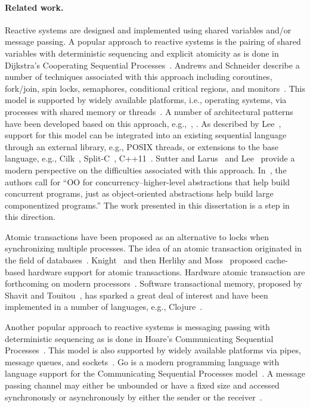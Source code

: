 \paragraph{Related work.}
Reactive systems are designed and implemented using shared variables and/or message passing.
A popular approach to reactive systems is the pairing of shared variables with deterministic sequencing and explicit atomicity as is done in Dijkstra's Cooperating Sequential Processes~\cite{dijkstra1965cooperating}.
Andrews and Schneider describe a number of techniques associated with this approach including coroutines, fork/join, spin locks, semaphores, conditional critical regions, and monitors~\cite{andrews1983concepts}.
This model is supported by widely available platforms, i.e., operating systems, via processes with shared memory or threads~\cite{silberschatz2005operating}.
A number of architectural patterns have been developed based on this approach, e.g.,~\cite{schmidt2000pattern}, \cite{lea2000concurrent}.
As described by Lee~\cite{lee2006problem}, support for this model can be integrated into an existing sequential language through an external library, e.g., POSIX threads, or extensions to the base language, e.g., Cilk~\cite{blumofe1995cilk}, Split-C~\cite{culler1993parallel}, C++11~\cite{cxx11}.
Sutter and Larus~\cite{sutter2005software} and Lee~\cite{lee2006problem} provide a modern perspective on the difficulties associated with this approach.
In~\cite{sutter2005software}, the authors call for ``OO for concurrency--higher-level abstractions that help build concurrent programs, just as object-oriented abstractions help build large componentized programs.''
The work presented in this dissertation is a step in this direction.

Atomic transactions have been proposed as an alternative to locks when synchronizing multiple processes.
The idea of an atomic transaction originated in the field of databases~\cite{Eswaran:1976:NCP:360363.360369}.
Knight~\cite{Knight:1986:AMF:319838.319854} and then Herlihy and Moss~\cite{Herlihy:1993:TMA:165123.165164} proposed cache-based hardware support for atomic transactions.
Hardware atomic transaction are forthcoming on modern processors~\cite{haswell}.
Software transactional memory, proposed by Shavit and Touitou~\cite{shavit1997software}, has sparked a great deal of interest and have been implemented in a number of languages, e.g., Clojure~\cite{halloway2009programming}.

Another popular approach to reactive systems is messaging passing with deterministic sequencing as is done in Hoare's Communicating Sequential Processes~\cite{hoare1978communicating}.
This model is also supported by widely available platforms via pipes, message queues, and sockets~\cite{silberschatz2005operating}.
Go is a modern programming language with language support for the Communicating Sequential Processes model~\cite{go}.
A message passing channel may either be unbounded or have a fixed size and accessed synchronously or asynchronously by either the sender or the receiver~\cite{andrews1983concepts}.

